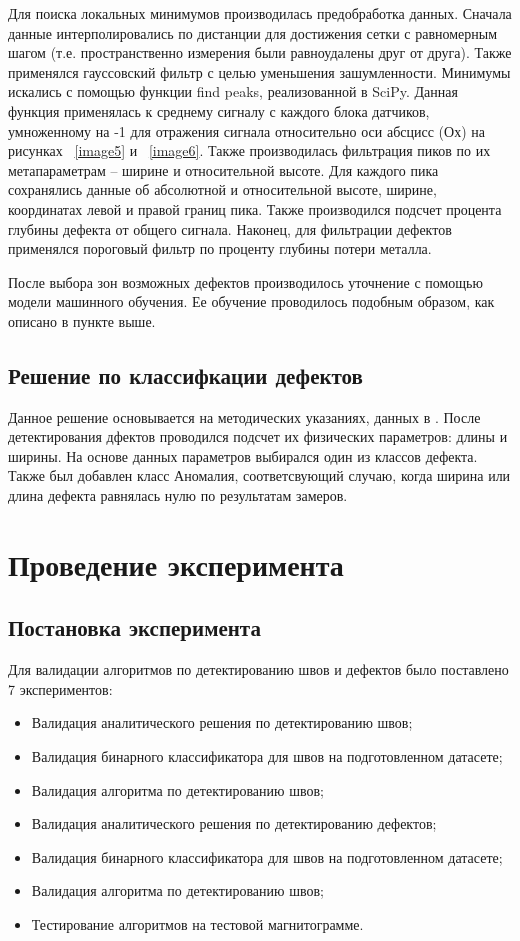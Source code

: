 \documentclass[a4paper,article,14pt]{extarticle}
\begin{document}
Для поиска локальных минимумов производилась предобработка данных. Сначала данные интерполировались по 
дистанции для достижения сетки с равномерным шагом (т.е. пространственно измерения были равноудалены друг от друга). 
Также применялся гауссовский фильтр с целью уменьшения зашумленности. Минимумы искались с помощью функции find peaks, 
реализованной в SciPy. Данная функция применялась к среднему сигналу с каждого блока датчиков, умноженному на -1 
для отражения сигнала относительно оси абсцисс (Ох) на рисунках  ~\ref{image5} и ~\ref{image6}. Также производилась фильтрация пиков по их 
метапараметрам – ширине и относительной высоте. Для каждого пика сохранялись данные об абсолютной и относительной 
высоте, ширине, координатах левой и правой границ пика. Также производился подсчет процента глубины дефекта от общего 
сигнала. Наконец, для фильтрации дефектов применялся пороговый фильтр по проценту глубины потери металла.

После выбора зон возможных дефектов производилось уточнение с помощью модели машинного обучения. Ее обучение 
проводилось подобным образом, как описано в пункте выше.

\subsection{Решение по классифкации дефектов}

Данное решение основывается на методических указаниях, данных в \cite{g1}. 
После детектирования дфектов проводился подсчет их физических параметров: длины и ширины. 
На основе данных параметров выбирался один из классов дефекта. 
Также был добавлен класс \flqq Аномалия\frqq, соответсвующий случаю, когда ширина или длина 
дефекта равнялась нулю по результатам замеров.


\pagebreak
\section{Проведение эксперимента}

\subsection{Постановка эксперимента}

Для валидации алгоритмов по детектированию швов и дефектов было поставлено 7 экспериментов:
\begin{itemize}
    \item Валидация аналитического решения по детектированию швов;
    \item Валидация бинарного классификатора для швов на подготовленном датасете;
    \item Валидация алгоритма по детектированию швов;
    \item Валидация аналитического решения по детектированию дефектов;
    \item Валидация бинарного классификатора для швов на подготовленном датасете;
    \item Валидация алгоритма по детектированию швов;
    \item Тестирование алгоритмов на тестовой магнитограмме.
\end{itemize}
\end{document}
